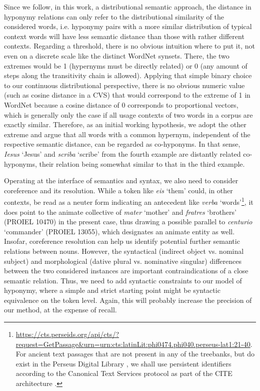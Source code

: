 Since we follow, in this work, a distributional semantic approach, the distance in hyponymy relations can only refer to the distributional similarity of the considered words, i.e. hyponymy pairs with a more similar distribution of typical context words will have less semantic distance than those with rather different contexts. Regarding a threshold, there is no obvious intuition where to put it, not even on a discrete scale like the distinct WordNet synsets. There, the two extremes would be 1 (hypernyms must be directly related) or 0 (any amount of steps along the transitivity chain is allowed). Applying that simple binary choice to our continuous distributional perspective, there is no obvious numeric value (such as cosine distance in a \gls{CVS}) that would correspond to the extreme of 1 in WordNet because a cosine distance of 0 corresponds to proportional vectors, which is generally only the case if all usage contexts of two words in a corpus are exactly similar. Therefore, as an initial working hypothesis, we adopt the other extreme and argue that all words with a common hypernym, independent of the respective semantic distance, can be regarded as co-hyponyms. In that sense, \textit{Iesus} `Jesus' and \textit{scriba} `scribe' from the fourth example are distantly related co-hyponyms, their relation being somewhat similar to that in the third example.

Operating at the interface of semantics and syntax, we also need to consider coreference and its resolution. While a token like \textit{eis} `them' could, in other contexts, be read as a neuter form indicating an antecedent like \textit{verba} `words'\footnote{\url{https://cts.perseids.org/api/cts/?request=GetPassage&urn=urn:cts:latinLit:phi0474.phi040.perseus-lat1:21-40}. For ancient text passages that are not present in any of the treebanks, but do exist in the Perseus Digital Library \parencite{cranePerseusDigitalLibrary2023}, we shall use persistent identifiers according to the Canonical Text Services \parencite{clericePerseidsCanonicalText} protocol as part of the CITE architecture \parencite{blackwellCanonicalTextServices2015}.}, it does point to the animate collective of \textit{mater} `mother' and \textit{fratres} `brothers' (PROIEL 10470) in the present case, thus drawing a possible parallel to \textit{centurio} `commander' (PROIEL 13055), which designates an animate entity as well. Insofar, coreference resolution can help us identify potential further semantic relations between nouns. However, the syntactical (indirect object vs. nominal subject) and morphological (dative plural vs. nominative singular) differences between the two considered instances are important contraindications of a close semantic relation. Thus, we need to add syntactic constraints to our model of hyponymy, where a simple and strict starting point might be syntactic equivalence on the token level. Again, this will probably increase the precision of our method, at the expense of recall.

